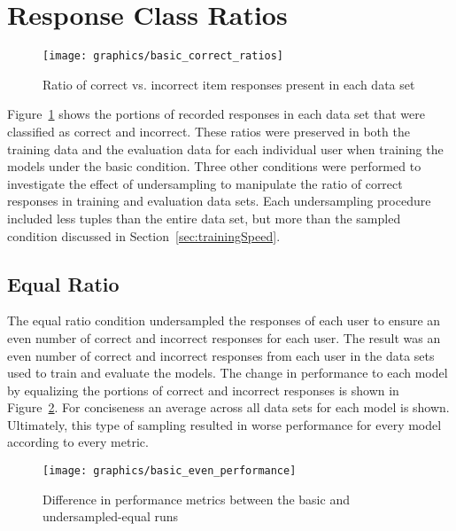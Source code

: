 \documentclass[letterpaper, 12pt, captions=tableabove]{scrreprt}
\begin{document}
	\section{Response Class Ratios}
	\label{sec:responseClassRatios}

		\begin{figure}[htbp]
			\centering
			\texttt{[image: graphics/basic\_correct\_ratios]}
			\captionsetup{justification=centering}
			\caption{Ratio of correct vs. incorrect item responses present in each data set}
			\label{fig:basicCorrectRatios}
		\end{figure}
		Figure~\ref{fig:basicCorrectRatios} shows the portions of recorded responses in each data set that were classified as correct and incorrect. These ratios were preserved in both the training data and the evaluation data for each individual user when training the models under the basic condition. Three other conditions were performed to investigate the effect of undersampling to manipulate the ratio of correct responses in training and evaluation data sets. Each undersampling procedure included less tuples than the entire data set, but more than the sampled condition discussed in Section~\ref{sec:trainingSpeed}.

		\subsection{Equal Ratio}
		\label{sub:equalRatio}

			The equal ratio condition undersampled the responses of each user to ensure an even number of correct and incorrect responses for each user. The result was an even number of correct and incorrect responses  from each user in the data sets used to train and evaluate the models. The change in performance to each model by equalizing the portions of correct and incorrect responses is shown in Figure~\ref{fig:basicVsEqualPerformance}.  For conciseness an average across all data sets for each model is shown. Ultimately, this type of sampling resulted in worse performance for every model according to every metric.

			\begin{figure}[htbp]
				\centering
				\texttt{[image: graphics/basic\_even\_performance]}
				\captionsetup{justification=centering}
				\caption{Difference in performance metrics between the basic and undersampled-equal runs}
				\label{fig:basicVsEqualPerformance}
			\end{figure}
	
\end{document}
